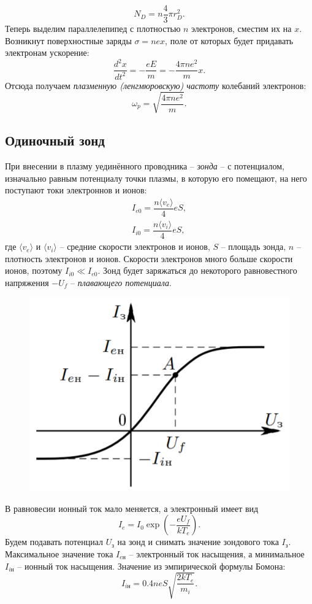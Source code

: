 \documentclass[a4paper,12pt]{article}
\begin{document}
\begin{equation}
N_D = n\dfrac{4}{3}\pi r_D^2.
\end{equation}
Теперь выделим параллелепипед с плотностью $n$ электронов, сместим их на $x$. Возникнут поверхностные заряды $\sigma = nex$, поле от которых будет придавать электронам ускорение:
$$
\dfrac{d^2x}{dt^2}=-\dfrac{eE}{m}=-\dfrac{4\pi n e^2}{m}x.
$$ 
Отсюда получаем \textit{плазменную (ленгмюровскую) частоту} колебаний электронов:
\begin{equation}
\omega_p = \sqrt{\dfrac{4\pi ne^2}{m}}.
\end{equation}
\subsection*{Одиночный зонд}
При внесении в плазму уединённого проводника -- \textit{зонда} -- с потенциалом, изначально равным потенциалу точки плазмы, в которую его помещают, на него поступают токи электроннов и ионов:
\begin{equation}
\begin{array}{c}
I_{e0} = \dfrac{n \langle v_e \rangle}{4}eS,\\
I_{i0} = \dfrac{n \langle v_i \rangle}{4}eS,
\end{array}
\end{equation}
где $\langle v_e \rangle$ и $\langle v_i \rangle$ -- средние скорости электронов и ионов, $S$ -- площадь зонда, $n$ -- плотность электронов и ионов. Скорости электронов много больше скорости ионов, поэтому $I_{i0} \ll I_{e0}$. Зонд будет заряжаться до некоторого равновестного напряжения $-U_f$ -- \textit{плавающего потенциала}.\\
\begin{figure}
\includegraphics[scale=0.5]{3.png}
\end{figure}  
В равновесии ионный ток мало меняется, а электронный имеет вид
$$
I_e = I_0 \exp\left( -\dfrac{eU_f}{kT_e} \right).
$$
Будем подавать потенциал $U_\text{з}$ на зонд и снимать значение зондового тока $I_\text{з}$. Максимальное значение тока $I_{e\text{н}}$ -- электронный ток насыщения, а минимальное $I_{i\text{н}}$ -- ионный ток насыщения. Значение из эмпирической формулы Бомона:
\begin{equation}
I_{i\text{н}} = 0.4 neS \sqrt{\dfrac{2kT_e}{m_i}}.
\end{equation}
\end{document}

